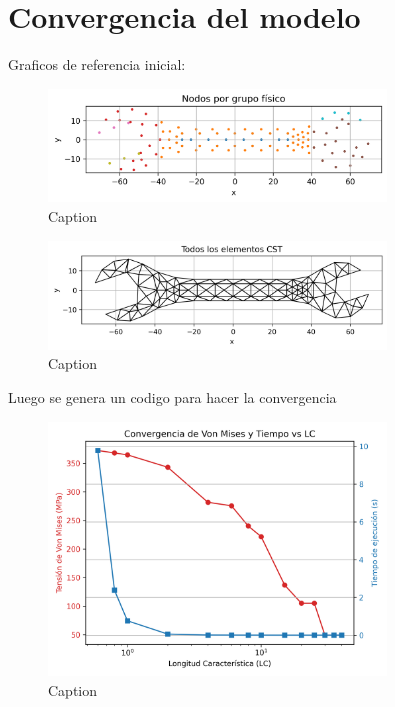 \documentclass{article}  %
\begin{document}
\newpage

\section{Convergencia del modelo}

Graficos de referencia inicial:

\begin{figure}[H]
  \centering
  \includegraphics[width=0.8\textwidth]{GRAFICOS/Initial_nodes_por_grupo.png}
  \caption{Caption}
  \label{fig:wrench}
\end{figure}

\begin{figure}[H]
  \centering
  \includegraphics[width=0.8\textwidth]{GRAFICOS/Initial_elementos.png}
  \caption{Caption}
  \label{fig:deformed_shape}
\end{figure}

Luego se genera un codigo para hacer la convergencia

\begin{figure}[H]
  \centering
  \includegraphics[width=0.8\textwidth]{GRAFICOS/convergencia.png}
  \caption{Caption}
  \label{fig:wrench}
\end{figure}
\end{document}
